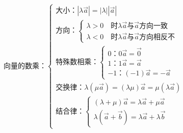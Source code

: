\mbox{向量的数乘：}$\begin{cases}
	\mbox{大小：}|\lambda \overrightarrow{a}|=|\lambda||\overrightarrow{a}|\\
	\mbox{方向：}\begin{cases}
		\lambda>0\quad\mbox{时}\lambda\overrightarrow{a}\mbox{与}\overrightarrow{a}\mbox{方向一致}\\
		\lambda<0\quad\mbox{时}\lambda\overrightarrow{a}\mbox{与}\overrightarrow{a}\mbox{方向相反不}
	\end{cases}\\
\mbox{特殊数相乘：}\begin{cases}
	0\mbox{：}0\overrightarrow{a}=\overrightarrow{0}\\
	1\mbox{：}1\overrightarrow{a}=\overrightarrow{a}\\
	-1\mbox{：}(-1)\overrightarrow{a}=-\overrightarrow{a}
\end{cases}\\
\mbox{交换律：}\lambda(\mu\overrightarrow{a})=(\lambda\mu)\overrightarrow{a}=\mu(\lambda\overrightarrow{a})\\
\mbox{结合律：}\begin{cases}
	(\lambda+\mu)\overrightarrow{a}=\lambda\overrightarrow{a}+\mu\overrightarrow{a}\\
	\lambda(\overrightarrow{a}+\overrightarrow{b})=\lambda\overrightarrow{a}+\lambda\overrightarrow{b}
\end{cases}
\end{cases}$

